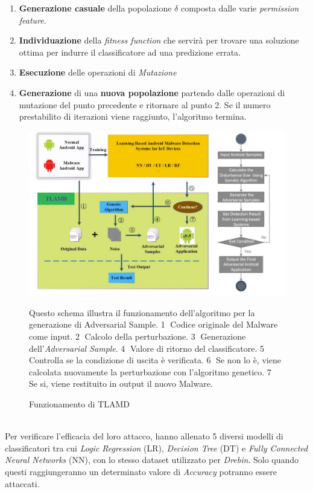 \begin{enumerate}
    \item \textbf{Generazione casuale} della popolazione \(\delta\) composta dalle varie \textit{permission feature}.
    \item \textbf{Individuazione} della \textit{fitness function} che servirà per trovare una soluzione ottima per indurre il classificatore ad una predizione errata.
    \item \textbf{Esecuzione} delle operazioni di \textit{Mutazione}
    \item \textbf{Generazione} di una \textbf{nuova popolazione} partendo dalle operazioni di mutazione del punto precedente e ritornare al punto 2. Se il numero prestabilito di iterazioni viene raggiunto, l'algoritmo termina.
\end{enumerate}

\begin{figure}[H]
  \includegraphics[scale=0.5]{aml_vs_md/imgs/iot.png}
  \caption{Funzionamento di TLAMD}
  Questo schema illustra il funzionamento dell'algoritmo per la generazione di Adversarial Sample\cite{iot}. \textcircled{1} Codice originale del Malware come input. \textcircled{2} Calcolo della perturbazione. \textcircled{3} Generazione dell'\textit{Adversarial Sample}. \textcircled{4} Valore di ritorno del classificatore. \textcircled{5} Controlla se la condizione di uscita è verificata. \textcircled{6} Se non lo è, viene calcolata nuovamente la perturbazione con l'algoritmo genetico. \textcircled{7} Se si, viene restituito in output il nuovo Malware.
\end{figure}
\ \\
Per verificare l'efficacia del loro attacco, hanno allenato 5 diversi modelli di classificatori tra cui \textit{Logic Regression} (LR), \textit{Decision Tree} (DT) e \textit{Fully Connected Neural Networks} (NN), con lo stesso dataset utilizzato per \textit{Drebin}. Solo quando questi raggiungeranno un determinato valore di \textit{Accuracy} potranno essere attaccati.\\

